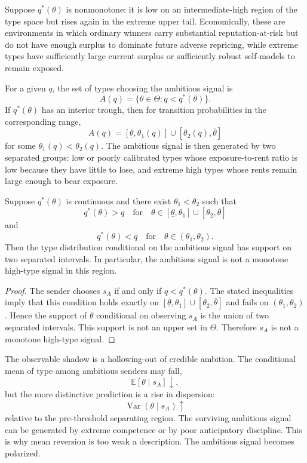 Suppose \(q^*(\theta)\) is nonmonotone: it is low on an intermediate-high region of the type space but rises again in the extreme upper tail. Economically, these are environments in which ordinary winners carry substantial reputation-at-risk but do not have enough surplus to dominate future adverse repricing, while extreme types have sufficiently large current surplus or sufficiently robust self-models to remain exposed.

For a given \(q\), the set of types choosing the ambitious signal is
\[
A(q)=\{\theta\in\Theta:q<q^*(\theta)\}.
\]
If \(q^*(\theta)\) has an interior trough, then for transition probabilities in the corresponding range,
\[
A(q)=[\underline\theta,\theta_1(q)]\cup[\theta_2(q),\overline\theta]
\]
for some \(\theta_1(q)<\theta_2(q)\). The ambitious signal is then generated by two separated groups: low or poorly calibrated types whose exposure-to-rent ratio is low because they have little to lose, and extreme high types whose rents remain large enough to bear exposure.

\begin{proposition}
\label{prop:polarized-degradation}
Suppose \(q^*(\theta)\) is continuous and there exist \(\theta_1<\theta_2\) such that
\[
q^*(\theta)>q \quad\text{for}\quad \theta\in[\underline\theta,\theta_1]\cup[\theta_2,\overline\theta]
\]
and
\[
q^*(\theta)<q \quad\text{for}\quad \theta\in(\theta_1,\theta_2).
\]
Then the type distribution conditional on the ambitious signal has support on two separated intervals. In particular, the ambitious signal is not a monotone high-type signal in this region.
\end{proposition}

\begin{proof}
The sender chooses \(s_A\) if and only if \(q<q^*(\theta)\). The stated inequalities imply that this condition holds exactly on \([\underline\theta,\theta_1]\cup[\theta_2,\overline\theta]\) and fails on \((\theta_1,\theta_2)\). Hence the support of \(\theta\) conditional on observing \(s_A\) is the union of two separated intervals. This support is not an upper set in \(\Theta\). Therefore \(s_A\) is not a monotone high-type signal.
\end{proof}

The observable shadow is a hollowing-out of credible ambition. The conditional mean of type among ambitious senders may fall,
\[
\mathbb E[\theta\mid s_A]\downarrow,
\]
but the more distinctive prediction is a rise in dispersion:
\[
\operatorname{Var}(\theta\mid s_A)\uparrow
\]
relative to the pre-threshold separating region. The surviving ambitious signal can be generated by extreme competence or by poor anticipatory discipline. This is why mean reversion is too weak a description. The ambitious signal becomes polarized.

